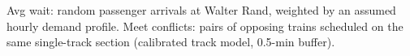 \documentclass[10pt,landscape]{article}
\begin{document}
\noindent Avg wait: random passenger arrivals at Walter Rand, weighted by an assumed hourly demand profile. Meet conflicts: pairs of opposing trains scheduled on the same single-track section (calibrated track model, 0.5-min buffer).
\clearpage
\tableofcontents
\clearpage

\end{document}
